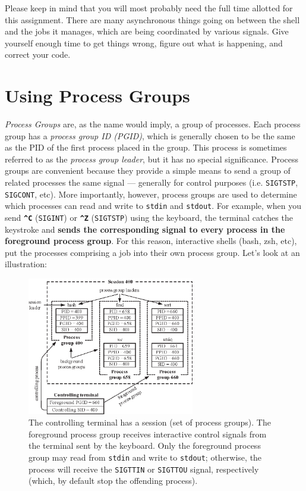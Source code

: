 \documentclass[10pt]{article}
\newcommand{\ctrl}[1]{\texttt{\textbf{\string^#1}}}
\begin{document}
\vspace{48pt}

Please keep in mind that you will most probably need the full time
allotted for this assignment.  There are many asynchronous things going
on between the shell and the jobs it manages, which are being
coordinated by various signals.  Give yourself enough time to get things
wrong, figure out what is happening, and correct your code.


\pagebreak

\section{Using Process Groups}

\emph{Process Groups} are, as the name would imply, a group of
processes.  Each process group has a \emph{process group ID (PGID)},
which is generally chosen to be the same as the PID of the first process
placed in the group.  This process is sometimes referred to as the
\emph{process group leader}, but it has no special significance.
Process groups are convenient because they provide a simple means to
send a group of related processes the same signal --- generally for
control purposes (i.e. \texttt{SIGTSTP}, \texttt{SIGCONT}, etc).  More
importantly, however, process groups are used to determine which
processes can read and write to \texttt{stdin} and \texttt{stdout}.  For
example, when you send \ctrl{C} (\texttt{SIGINT}) or \ctrl{Z}
(\texttt{SIGTSTP}) using the keyboard, the terminal catches the
keystroke and \textbf{sends the corresponding signal to every process in
the foreground process group}.  For this reason, interactive shells
(bash, zsh, etc), put the processes comprising a job into their own
process group.  Let's look at an illustration:

\begin{figure}[h!]
\begin{center}
    \includegraphics[width=0.65\textwidth]{fig/pgrp}
\end{center}
\caption{The controlling terminal has a session (set of process groups).
The foreground process group receives interactive control signals from
the terminal sent by the keyboard.  Only the foreground process group
may read from \texttt{stdin} and write to \texttt{stdout}; otherwise,
the process will receive the \texttt{SIGTTIN} or \texttt{SIGTTOU}
signal, respectively (which, by default stop the offending process).}
\label{fig:pgrp}
\end{figure}
\end{document}
